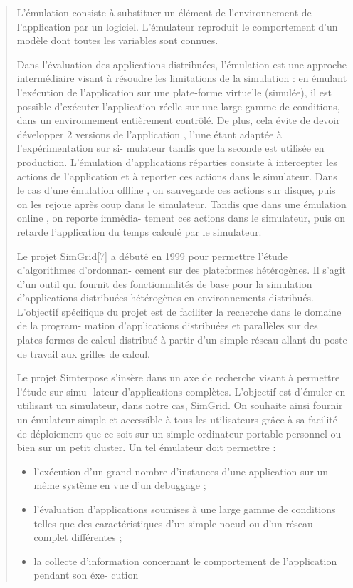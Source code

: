 \documentclass{article}
\begin{document}
\begin{quotation}
L’émulation consiste à substituer un élément de l’environnement de l’application
par un logiciel. L’émulateur reproduit le comportement d’un modèle dont toutes
les variables sont connues.

Dans l’évaluation des applications distribuées, l’émulation est une approche
intermédiaire visant à résoudre les limitations de la simulation : {\color{red}
  en émulant l’exécution de l’application sur une plate-forme virtuelle
  (simulée), il est possible d’exécuter l’application réelle sur une large gamme
  de conditions, dans un environnement entièrement contrôlé.} De plus, cela
évite de devoir développer 2 versions de l’application , l’une étant adaptée à
l’expérimentation sur si- mulateur tandis que la seconde est utilisée en
production. L’émulation d’applications réparties consiste à intercepter les
actions de l’application et à reporter ces actions dans le simulateur.  Dans le
cas d’une émulation offline , on sauvegarde ces actions sur disque, puis on les
rejoue après coup dans le simulateur. Tandis que dans une émulation online , on
reporte immédia- tement ces actions dans le simulateur, puis on retarde
l’application du temps calculé par le simulateur.

{\color{green} Le projet SimGrid[7] a débuté en 1999 pour permettre l’étude
  d’algorithmes d’ordonnan- cement sur des plateformes hétérogènes. Il s’agit
  d’un outil qui fournit des fonctionnalités de base pour la simulation
  d’applications distribuées hétérogènes en environnements distribués.
  L’objectif spécifique du projet est de faciliter la recherche dans le domaine
  de la program- mation d’applications distribuées et parallèles sur des
  plates-formes de calcul distribué à partir d’un simple réseau allant du poste
  de travail aux grilles de calcul.

Le projet Simterpose s’insère dans un axe de recherche visant à permettre
l’étude sur simu- lateur d’applications complètes. L’objectif est d’émuler en
utilisant un simulateur, dans notre cas, SimGrid. On souhaite ainsi fournir un
émulateur simple et accessible à tous les utilisateurs grâce à sa facilité de
déploiement que ce soit sur un simple ordinateur portable personnel ou bien sur
un petit cluster. Un tel émulateur doit permettre :
\begin{itemize}
\item l'exécution d’un grand nombre d’instances d’une application sur un même
  système en vue d’un debuggage ;
\item l’évaluation d’applications soumises à une large gamme de conditions
  telles que des caractéristiques d’un simple noeud ou d’un réseau complet
  différentes ;
\item la collecte d’information concernant le comportement de l’application
  pendant son éxe- cution
\end{itemize}
}
\end{quotation}
\end{document}
